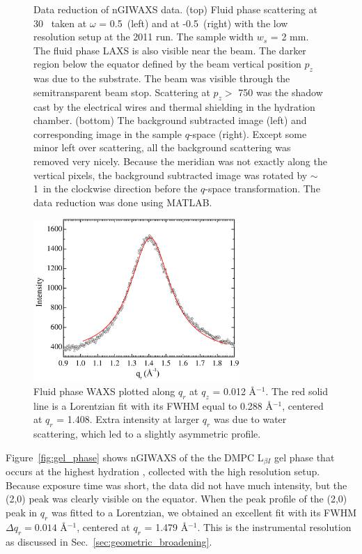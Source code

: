 \begin{figure}[htbp]
  {Data reduction of nGIWAXS data. (top) Fluid phase scattering at
  30 \textcelsius\ taken at $\omega$ = 0.5\textdegree\ (left) 
  and at -0.5\textdegree\ (right) with the low resolution setup at the 
  2011 run. The sample width $w_s$ = 2 mm.
  The fluid phase LAXS is also visible near the beam.  
  The darker region below the equator defined by 
  the beam vertical position $p_z$ was due to the substrate. The beam
  was visible through the semitransparent beam stop.
  Scattering at $p_z >$ 750 was the shadow cast by the electrical wires 
  and thermal shielding in the hydration chamber.
  (bottom) The background subtracted 
  image (left) and corresponding image in the sample $q$-space (right).
  Except some minor left over scattering, all the background scattering was 
  removed very nicely. Because the meridian was not exactly along the vertical
  pixels, the background subtracted image was rotated by $\sim$1\textdegree\
  in the clockwise direction before the $q$-space transformation. The data
  reduction was done using MATLAB.}
  \label{fig:waxs_data_reduction}
\end{figure}

\begin{figure}[htbp]
  \centering
  \includegraphics[width=0.7\textwidth]{figures/ripple/nGIWAXS/fluid_qr}
  \caption{Fluid phase WAXS plotted along $q_r$ at $q_z$ = 0.012 \AA$^{-1}$.
  The red solid line is a Lorentzian fit with its FWHM equal to 0.288 \AA$^{-1}$,
  centered at $q_r$ = 1.408. Extra intensity at larger $q_r$ was due to
  water scattering, which led to a slightly asymmetric profile.}
  \label{fig:fluid_qr}
\end{figure}

Figure~\ref{fig:gel_phase} shows nGIWAXS of the the DMPC L$_{\beta I}$ gel phase
that occurs at the highest hydration \cite{ref:Smith88,Tristram-Nagle02},
collected with the high resolution setup. Because exposure time was short,
the data did not have much intensity, but the (2,0) peak was clearly 
visible on the equator.
When the peak profile of the (2,0) peak in $q_r$ was fitted to a Lorentzian, 
we obtained an excellent fit with its FWHM $\Delta q_r = 0.014$ \AA$^{-1}$,
centered at $q_r$ = 1.479 \AA$^{-1}$.
This is the instrumental resolution as discussed in Sec.~\ref{sec:geometric_broadening}. 

